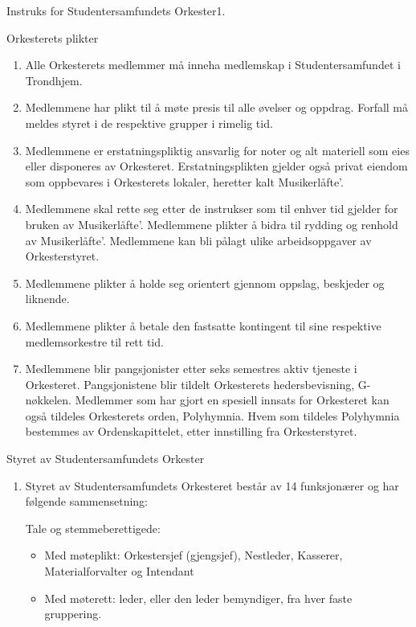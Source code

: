 \begin{instruks}{Instruks for Studentersamfundets Orkester}{1. }{ }
    \begin{instruksledd}{Orkesterets plikter}
        \begin{enumerate}
            \item Alle Orkesterets medlemmer må inneha medlemskap i Studentersamfundet i Trondhjem.
            \item Medlemmene har plikt til å møte presis til alle øvelser og oppdrag. Forfall må meldes
                styret i de respektive
                grupper i rimelig tid.
            \item Medlemmene er erstatningspliktig ansvarlig for noter og alt materiell som eies eller
                disponeres av Orkesteret.
                Erstatningsplikten gjelder også privat eiendom som oppbevares i Orkesterets lokaler, heretter kalt
                Musikerlåfte'.
            \item Medlemmene skal rette seg etter de instrukser som til enhver tid gjelder for bruken av
                Musikerlåfte'.
                Medlemmene plikter å bidra til rydding og renhold av Musikerlåfte'. Medlemmene kan bli pålagt ulike
                arbeidsoppgaver av Orkesterstyret.
            \item Medlemmene plikter å holde seg orientert gjennom oppslag, beskjeder og liknende.
            \item Medlemmene plikter å betale den fastsatte kontingent til sine respektive
                medlemsorkestre til rett tid.
            \item Medlemmene blir pangsjonister etter seks semestres aktiv tjeneste i Orkesteret.
                Pangsjonistene blir tildelt
                Orkesterets hedersbevisning, G-nøkkelen. Medlemmer som har gjort en spesiell innsats for Orkesteret
                kan
                også tildeles Orkesterets orden, Polyhymnia. Hvem som tildeles Polyhymnia bestemmes av
                Ordenskapittelet,
                etter innstilling fra Orkesterstyret.
        \end{enumerate}
    \end{instruksledd}

    \begin{instruksledd}{Styret av Studentersamfundets Orkester}
        \begin{enumerate}
            \item Styret av Studentersamfundets Orkesteret består av 14 funksjonærer og har følgende
                sammensetning:

                Tale og stemmeberettigede:
                \begin{itemize}
                    \item Med møteplikt: Orkestersjef (gjengsjef), Nestleder, Kasserer, Materialforvalter og
                        Intendant
                    \item Med møterett: leder, eller den leder bemyndiger, fra hver faste gruppering.
                \end{itemize}


\end{enumerate}
\end{instruksledd}
\end{instruks}
